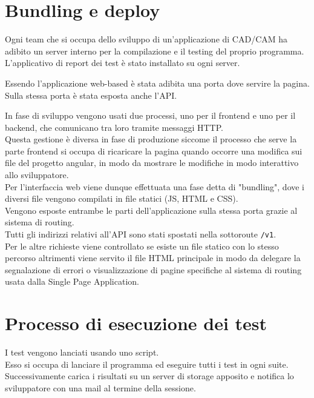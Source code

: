     \section{Bundling e deploy}
        Ogni team che si occupa dello sviluppo di un'applicazione di CAD/CAM ha adibito un server interno per la compilazione e il testing del proprio programma.\\
        L'applicativo di report dei test è stato installato su ogni server.

        Essendo l'applicazione web-based è stata adibita una porta dove servire la pagina.\\
        Sulla stessa porta è stata esposta anche l'API.
        
        In fase di sviluppo vengono usati due processi, uno per il frontend e uno per il backend, che comunicano tra loro tramite messaggi HTTP.\\
        Questa gestione è diversa in fase di produzione siccome il processo che serve la parte frontend si occupa di ricaricare la pagina quando occorre una modifica sui file del progetto angular, in modo da mostrare le modifiche in modo interattivo allo sviluppatore.\\
        Per l'interfaccia web viene dunque effettuata una fase detta di "bundling", dove i diversi file  vengono compilati in file statici (JS, HTML e CSS).\\
        Vengono esposte entrambe le parti dell'applicazione sulla stessa porta grazie al sistema di routing.\\
        Tutti gli indirizzi relativi all'API sono stati spostati nella sottoroute \verb|/v1|.\\
        Per le altre richieste viene controllato se esiste un file statico con lo stesso percorso altrimenti viene servito il file HTML principale in modo da delegare la segnalazione di errori o visualizzazione di pagine specifiche al sistema di routing usata dalla Single Page Application.\\

    \section{Processo di esecuzione dei test\label{testexecution}}
        I test vengono lanciati usando uno script.\\
        Esso si occupa di lanciare il programma ed eseguire tutti i test in ogni suite.\\
        Successivamente carica i risultati su un server di storage apposito e notifica lo sviluppatore con una mail al termine della sessione.\\

